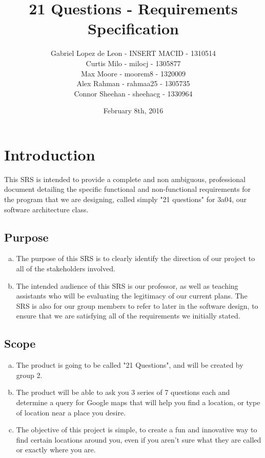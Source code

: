 \documentclass[titlepage]{article}
\title{\textbf{21 Questions - Requirements Specification}}
\author{Gabriel Lopez de Leon - INSERT MACID - 1310514\\Curtis Milo - milocj - 1305877\\Max Moore - moorem8 - 1320009\\Alex Rahman - rahmaa25 - 1305735\\Connor Sheehan - sheehacg - 1330964}
\date{February 8th, 2016}
\begin{document}
	
	\maketitle
	\vspace{4cm}	
		\newpage
		\tableofcontents
		\newpage
		\section{Introduction}
		\label{sec:introduction}

		This SRS is intended to provide a complete and non ambiguous, professional document detailing the specific functional and non-functional 
		requirements for the program that we are designing, called simply "21 questions" for 3a04, our software architecture class.
		
		\subsection{Purpose}
		\label{sub:purpose}
		\begin{enumerate}[a)]

		\item The purpose of this SRS is to clearly identify the direction of our project to all of the stakeholders involved.
		\item The intended audience of this SRS is our professor, as well as teaching assistants who will be evaluating the legitimacy of our current plans. 		The SRS is also for our group members to refer to later in the software design, to ensure that we are satisfying all of the requirements we initially stated.
		\end{enumerate}

		
		\subsection{Scope}
		\label{sub:scope}
		\begin{enumerate}[a)]
			\item The product is going to be called "21 Questions", and will be created by group 2.
			\item The product will  be able to ask you 3 series of 7 questions each and determine a query for Google maps that will help you find a 				location, or type of location near a place you desire. 
			\item The objective of this project is simple, to create a fun and innovative way to find certain locations around you, even if you aren't 				sure what they are called or exactly where you are. 
		\end{enumerate}
		
\end{document}
